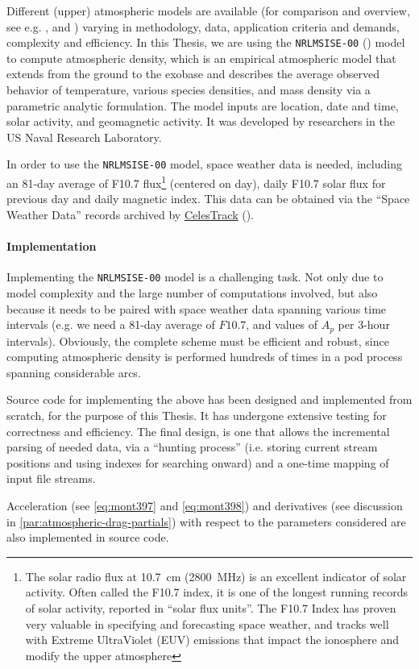 Different (upper) atmospheric models are available (for comparison and overview, 
see e.g. \cite{Doornbos2009}, \cite{Yang2022} and \cite{Vallado2014}) varying in 
methodology, data, application criteria and demands, complexity and efficiency. 
In this Thesis, we are using the \texttt{NRLMSISE-00} (\cite{nrlmsise00}) model 
to compute atmospheric density, which is an empirical atmospheric model that 
extends from the ground to the exobase and describes the average observed behavior 
of temperature, various species densities, and mass density via a parametric 
analytic formulation. The model inputs are location, date and time, solar activity, 
and geomagnetic activity. It was developed by researchers in the US Naval Research 
Laboratory.

In order to use the \texttt{NRLMSISE-00} model, space weather data is needed, including 
an 81-day average of F10.7 flux\footnote{The solar radio flux at \SI{10.7}{\cm} (\SI{2800}{\MHz}) 
is an excellent indicator of solar activity. Often called the F10.7 index, it is 
one of the longest running records of solar activity, reported in ``solar flux units''. 
The F10.7 Index has proven very valuable in specifying and forecasting space weather, 
and tracks well with Extreme UltraViolet (EUV) emissions that impact the ionosphere 
and modify the upper atmosphere} (centered on day), daily F10.7 solar flux for previous 
day and daily magnetic index. This data can be obtained via the ``Space Weather Data'' 
records archived by \href{https://celestrak.org/}{CelesTrack} (\cite{Vallado2013}).

\paragraph{Implementation}\label{par:atmospheric-drag-implementation}

Implementing the \texttt{NRLMSISE-00} model is a challenging task. Not only due to
model complexity and the large number of computations involved, but also because 
it needs to be paired with space weather data spanning various time intervals 
(e.g. we need a 81-day average of $F10.7$, and values of $A_p$ per 3-hour intervals). 
Obviously, the complete scheme must be efficient and robust, since computing atmospheric 
density is performed hundreds of times in a \gls{pod} process spanning considerable 
arcs.

Source code for implementing the above has been designed and implemented from 
scratch, for the purpose of this Thesis. It has undergone extensive testing for 
correctness and efficiency. The final design, is one that allows the incremental 
parsing of needed data, via a ``hunting process'' (i.e. storing current stream 
positions and using indexes for searching onward) and a one-time mapping of 
input file streams.

Acceleration (see \autoref{eq:mont397} and \autoref{eq:mont398}) and derivatives 
(see discussion in \autoref{par:atmospheric-drag-partials}) with respect to the 
parameters considered are also implemented in source code.

